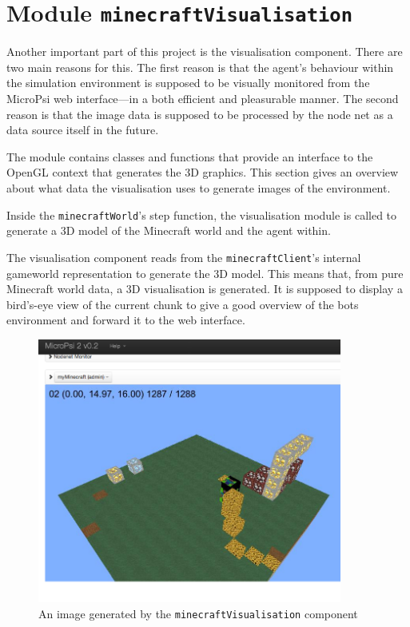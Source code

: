     \section{Module \texttt{minecraftVisualisation}}

    
Another important part of this project is the visualisation component. There are two main reasons for this. The first reason is that the agent's behaviour within the simulation environment is supposed to be visually monitored from the MicroPsi web interface---in a both efficient and pleasurable manner. The second reason is that the image data is supposed to be processed by the node net as a data source itself in the future.

The module contains classes and functions that provide an interface to the OpenGL context that generates the 3D graphics. This section gives an overview about what data the visualisation uses to generate images of the environment. 

Inside the \texttt{minecraftWorld}'s step function, the visualisation module is called to generate a 3D model of the Minecraft world and the agent within. 


The visualisation component reads from the \texttt{minecraftClient}'s internal gameworld representation to generate the 3D model. This means that, from pure Minecraft world data, a 3D visualisation is generated. It is supposed to display a bird's-eye view of the current chunk to give a good overview of the bots environment and forward it to the web interface.

\begin{figure}[h]
  \centering
    \includegraphics[width=10cm]{graphics/visualisation_screen}
  \caption{An image generated by the \texttt{minecraftVisualisation} component}
  \label{vis_screen}
\end{figure}

